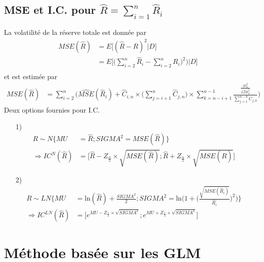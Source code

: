 \subsection*{MSE et I.C. pour $\widehat{R} = \sum_{i=1}^{n}\widehat{R}_i$}
La volatilité de la réserve totale est donnée par
\begin{align*}
MSE(\widehat{R}) &= E \Big[ (\widehat{R} - R)^2 |D \Big] \\
&= E \Bigg[ \bigg( \sum_{i=2}^{n} \widehat{R}_i -  \sum_{i=2}^{n} R_i)^2\bigg) \Big|D \Bigg] \\
\end{align*}
et est estimée par
\begin{align*}
MSE(\widehat{R}) &= \sum_{i=2}^{n} \Bigg( \widehat{MSE}(\widehat{R}_i) + \widehat{C}_{i,n} \times \Big( \sum_{j = i + 1}^{n} \widehat{C}_{j,n} \Big) \times \sum_{k = n - i + 1}^{n-1} \frac{\frac{2 \widehat{\sigma}_k^2}{\widehat{LDF}_k^2}}{\sum_{j=1}^{n-k} C_{j,k}}  \Bigg)
\end{align*}
Deux options fournies pour I.C.
\begin{itemize}
\item[1)] \begin{align*}
R \sim N \bigg\lbrace MU &= \widehat{R}; SIGMA^2 = MSE(\widehat{R}) \bigg\rbrace \\
\Rightarrow IC^N(\widehat{R}) &= \bigg[ \widehat{R} - Z_{\frac{\alpha}{2}} \times \sqrt{MSE(\widehat{R})}; \widehat{R} + Z_{\frac{\alpha}{2}} \times \sqrt{MSE(\widehat{R})} \bigg]
\end{align*}
\item[2)] \begin{align*}
R \sim LN \Bigg\lbrace MU &= \text{ln} (\widehat{R}) + \frac{SIGMA^2}{2}; SIGMA^2 = \text{ln} \Bigg( 1 + \Bigg( \frac{\sqrt{MSE(\widehat{R}_i)}}{\widehat{R_i}}\Bigg)^2 \Bigg) \Bigg\rbrace \\
\Rightarrow IC^{LN}(\widehat{R}) &= \bigg[ e^{MU - Z_{\frac{\alpha}{2}} \times \sqrt{SIGMA^2}}; e^{MU + Z_{\frac{\alpha}{2}} \times \sqrt{SIGMA^2}} \bigg]
\end{align*}
\end{itemize}

\section{Méthode basée sur les GLM}

